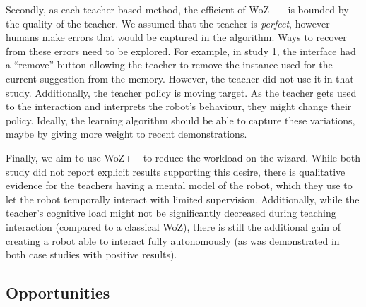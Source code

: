 \documentclass[manuscript, review, anonymous]{acmart}
\newcommand{\ES}[1]{\added[id=ES]{#1}}
\newcommand{\woz}{WoZ++\xspace}
\begin{document}
Secondly, as each teacher-based method, the efficient of \woz is bounded by the quality of the teacher.
We assumed that the teacher is \emph{perfect}, however humans make errors that would be captured in 
the algorithm. Ways to recover from these errors need to be explored. For example, in study 1, the 
interface had a ``remove'' button allowing the teacher to remove the instance used for the current 
suggestion from the memory. However, the teacher did not use it in that study. Additionally, 
the teacher policy is moving target. As the teacher gets used to the interaction and interprets
the robot's behaviour, they might change their policy. Ideally, the learning algorithm should
be able to capture these variations, maybe by giving more weight to recent demonstrations.

Finally, we aim to use \woz to reduce the workload on the wizard. While both study did not
report explicit results supporting this desire, there is qualitative evidence for
the teachers having a mental model of the robot, which they use to let the robot temporally interact
with limited supervision. Additionally, while the teacher's cognitive load might not be significantly 
decreased during teaching interaction (compared to a classical WoZ), there is still the additional 
gain of creating a robot able to interact fully autonomously (as was demonstrated in both case studies
with positive results).

\subsection{Opportunities}



\end{document}
